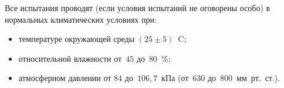 Все испытания проводят (если условия испытаний не оговорены особо) в нормальных климатических условиях при:
%
\begin{itemize}
	\item температуре окружающей среды $(25 \pm 5)$~\degree C;
	\item относительной влажности от~$45$ до~$80$~\%;
	\item атмосферном давлении от $84$ до~$106,7$~кПа (от~$630$ до~$800$~мм~рт.~ст.).
\end{itemize} 
